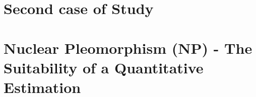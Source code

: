 \documentclass[usenames,dvipsnames]{beamer}
\begin{document}
       
		


\section{Second case of Study}

\section{ Nuclear Pleomorphism (NP) - The Suitability of a Quantitative Estimation}

\end{document}
